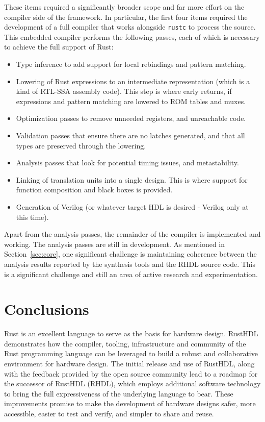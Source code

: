 \documentclass[conference]{IEEEtran}
\begin{document}
These items required a significantly broader scope and far more effort on the compiler side of the framework.  In particular,
the first four items required the development of a full compiler that works alongside \verb|rustc| to process the source. 
This embedded compiler performs the following passes, each of which is necessary to achieve the full support of Rust:
\begin {itemize}
  \item Type inference to add support for local rebindings and pattern matching.
  \item Lowering of Rust expressions to an intermediate representation (which is a kind of RTL-SSA assembly code).  This
  step is where early returns, if expressions and pattern matching are lowered to ROM tables and muxes.
  \item Optimization passes to remove unneeded registers, and unreachable code.
  \item Validation passes that ensure there are no latches generated, and that all types are preserved through the lowering.
  \item Analysis passes that look for potential timing issues, and metastability.
  \item Linking of translation units into a single design.  This is where support for function composition and black boxes is
  provided.
  \item Generation of Verilog (or whatever target HDL is desired - Verilog only at this time).
\end{itemize}
Apart from the analysis passes, the remainder of the compiler is implemented and working.  The analysis passes are still in
development.  As mentioned in Section~\ref{sec:core}, one significant challenge is maintaining coherence between the analysis 
results reported by the synthesis tools and the RHDL source code.  This is a significant challenge and still an area of 
active research and experimentation.

\section{Conclusions}\label{sec:conclusions}

Rust is an excellent language to serve as the basis for 
hardware design.  RustHDL demonstrates how the compiler, tooling, infrastructure and 
community of the Rust programming language can be leveraged to build a robust and 
collaborative environment for hardware design.  The initial release and use of RustHDL,
along with the feedback provided by the open source community lead to a roadmap for 
the successor of RustHDL (RHDL), which employs additional software technology to bring
the full expressiveness of the underlying language to bear.  These improvements
promise to make the development of hardware designs safer, more accessible, easier to test and 
verify, and simpler to share and reuse.
\end{document}
